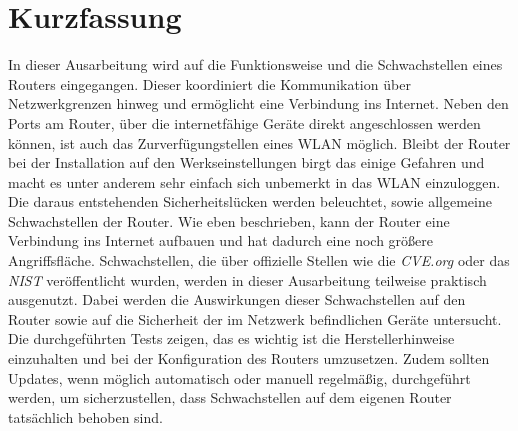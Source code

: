	\chapter*{Kurzfassung}
	In dieser Ausarbeitung wird auf die Funktionsweise und die Schwachstellen
	eines Routers eingegangen. Dieser koordiniert die Kommunikation über Netzwerkgrenzen
	hinweg und ermöglicht eine Verbindung ins Internet. Neben den Ports
	am Router, über die internetfähige Geräte direkt angeschlossen werden 
	können, ist auch das Zurverfügungstellen eines WLAN möglich. Bleibt der 
	Router bei der Installation auf den Werkseinstellungen birgt das einige
	Gefahren und macht es unter anderem sehr einfach sich unbemerkt in das WLAN
	einzuloggen. Die daraus entstehenden Sicherheitslücken werden beleuchtet, sowie
	allgemeine Schwachstellen der Router. Wie eben beschrieben, kann der
	Router eine Verbindung ins Internet aufbauen und hat dadurch eine 
	noch größere Angriffsfläche. Schwachstellen, die über 
	offizielle Stellen wie die \emph{CVE.org} oder das \emph{NIST} veröffentlicht 
	wurden, werden in dieser Ausarbeitung teilweise praktisch ausgenutzt. Dabei 
	werden die Auswirkungen dieser Schwachstellen auf den Router sowie auf 
	die Sicherheit der im Netzwerk befindlichen Geräte untersucht.
	Die durchgeführten Tests zeigen, das es wichtig ist die Herstellerhinweise
	einzuhalten und bei der Konfiguration des Routers
	umzusetzen. Zudem sollten 
	Updates, wenn möglich automatisch oder manuell regelmäßig, durchgeführt 
	werden, um sicherzustellen, dass Schwachstellen auf dem eigenen Router
	tatsächlich behoben sind.

	
